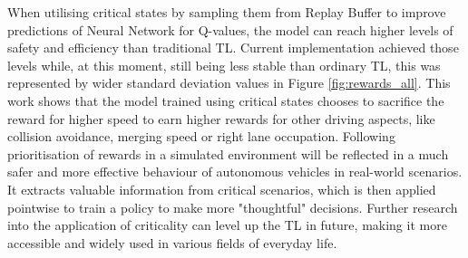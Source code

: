 When utilising critical states by sampling them from Replay Buffer to improve predictions of Neural Network for Q-values, the model can reach higher levels of safety and efficiency than traditional TL. Current implementation achieved those levels while, at this moment, still being less stable than ordinary TL, this was represented by wider standard deviation values in Figure \ref{fig:rewards_all}. This work shows that the model trained using critical states chooses to sacrifice the reward for higher speed to earn higher rewards for other driving aspects, like collision avoidance, merging speed or right lane occupation. Following prioritisation of rewards in a simulated environment will be reflected in a much safer and more effective behaviour of autonomous vehicles in real-world scenarios. It extracts valuable information from critical scenarios, which is then applied pointwise to train a policy to make more "thoughtful" decisions. Further research into the application of criticality can level up the TL in future, making it more accessible and widely used in various fields of everyday life.